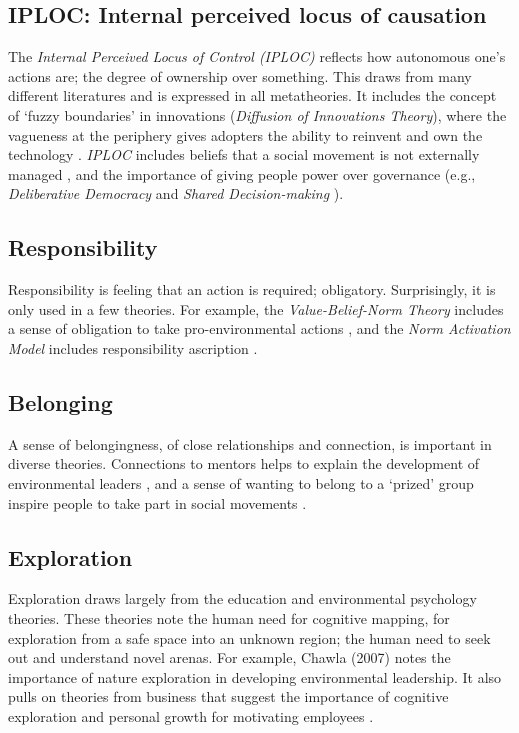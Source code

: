 \documentclass[12 pt]{article}
\begin{document}
		\subsection{IPLOC: Internal perceived locus of causation}
		The \textit{Internal Perceived Locus of Control (IPLOC)} \parencite{DeCharms1968} reflects how autonomous one's actions are; the degree of ownership over something. This draws from many different literatures and is expressed in all metatheories. It includes the concept of `fuzzy boundaries' in innovations (\textit{Diffusion of Innovations Theory}), where the vagueness at the periphery gives adopters the ability to reinvent and own the technology \parencite{Greenhalgh2004}. \textit{IPLOC} includes beliefs that a social movement is not externally managed \parencite{Polletta1998}, and the importance of giving people power over governance (e.g., \textit{Deliberative Democracy} \parencite{Miller1992, John2009} and \textit{Shared Decision-making} \parencite{Weiss1995}). 
		\subsection{Responsibility}
		Responsibility is feeling that an action is required; obligatory. Surprisingly, it is only used in a few theories. For example, the \textit{Value-Belief-Norm Theory} includes a sense of obligation to take pro-environmental actions \parencite{Stern2000}, and the \textit{Norm Activation Model} includes responsibility ascription \parencite{Schwartz1977}.
		\subsection{Belonging}
		A sense of belongingness, of close relationships and connection, is important in diverse theories. Connections to mentors helps to explain the development of environmental leaders \parencite{Chawla2007}, and a sense of wanting to belong to a `prized' group inspire people to take part in social movements \parencite{Oberschall1989,Polletta1998}. 
		\subsection{Exploration}
		Exploration draws largely from the education and environmental psychology theories. These theories note the human need for cognitive mapping, for exploration from a safe space into an unknown region; the human need to seek out and understand novel arenas. For example, Chawla (2007) notes the importance of nature exploration in developing environmental leadership. It also pulls on theories from business that suggest the importance of cognitive exploration and personal growth for motivating employees \parencite{Herzberg1968}. 
\end{document}
